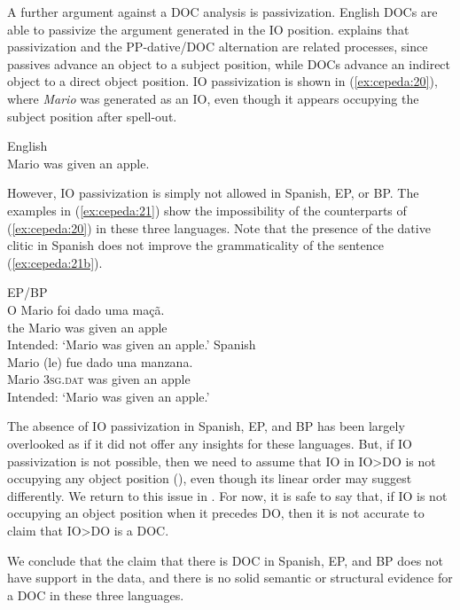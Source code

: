 \documentclass[output=paper,colorlinks,citecolor=brown,nonflat]{./langscibook}
\begin{document}
A further argument against a DOC analysis is passivization. English DOCs are able to passivize the argument generated in the IO position. \citet{Larson1988} explains that passivization and the PP-dative/DOC alternation are related processes, since passives advance an object to a subject position, while DOCs advance an indirect object to a direct object position. IO passivization is shown in (\ref{ex:cepeda:20}), where \textit{Mario} was generated as an IO, even though it appears occupying the subject position after spell-out.

\ea%
    \label{ex:cepeda:20} 
    English\\
	Mario was given an apple.
\z

However, IO passivization is simply not allowed in Spanish, EP, or BP. The examples in (\ref{ex:cepeda:21}) show the impossibility of the counterparts of (\ref{ex:cepeda:20}) in these three languages. Note that the presence of the dative clitic in Spanish does not improve the grammaticality of the sentence (\ref{ex:cepeda:21b}).

\ea%
    \label{ex:cepeda:21}
	\ea\label{ex:cepeda:21a}
	EP/BP\\
	\gll *O Mario  foi   dado uma maçã.\\
		the Mario was given an    apple\\
	\glt Intended: ‘Mario was given an apple.’
	\ex\label{ex:cepeda:21b}
	Spanish\\
	\gll  *Mario (le) fue dado  una manzana.\\
		Mario \textsc{3sg.dat} was given an apple\\
	\glt Intended: ‘Mario was given an apple.’
	\z
\z

The absence of IO passivization in Spanish, EP, and BP has been largely overlooked as if it did not offer any insights for these languages. But, if IO passivization is not possible, then we need to assume that IO in IO>DO is not occupying any object position (\citealt{Larson2014}), even though its linear order may suggest differently. We return to this issue in . For now, it is safe to say that, if IO is not occupying an object position when it precedes DO, then it is not accurate to claim that IO>DO is a DOC.

We conclude that the claim that there is DOC in Spanish, EP, and BP does not have support in the data, and there is no solid semantic or structural evidence for a DOC in these three languages. 
\end{document}
